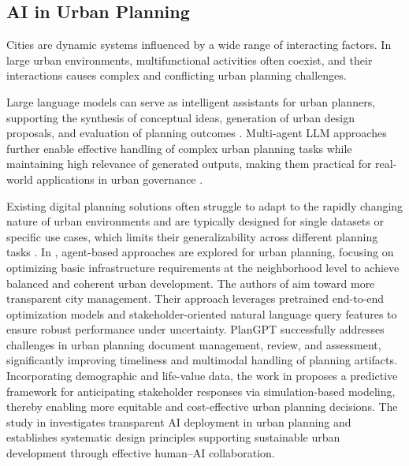 \subsection{AI in Urban Planning}

Cities are dynamic systems influenced by a wide range of interacting factors.
In large urban environments, multifunctional activities often coexist, and their interactions causes complex and conflicting urban planning challenges.

Large language models can serve as intelligent assistants for urban planners, supporting the synthesis of conceptual ideas, generation of urban design proposals, and evaluation of planning outcomes \cite{zheng2025urban}.
Multi-agent LLM approaches further enable effective handling of complex urban planning tasks while maintaining high relevance of generated outputs, making them practical for real-world applications in urban governance \cite{kalyuzhnaya2025llm}.

Existing digital planning solutions often struggle to adapt to the rapidly changing nature of urban environments and are typically designed for single datasets or specific use cases, which limits their generalizability across different planning tasks \cite{XIA2025106142}.
In \cite{singla2024adaptive}, agent-based approaches are explored for urban planning, focusing on optimizing basic infrastructure requirements at the neighborhood level to achieve balanced and coherent urban development.
The authors of \cite{jiao2024city} aim toward more transparent city management.
Their approach leverages pretrained end-to-end optimization models and stakeholder-oriented natural language query features to ensure robust performance under uncertainty. PlanGPT \cite{zhu2024plangpt} successfully addresses challenges in urban planning document management, review, and assessment, significantly improving timeliness and multimodal handling of planning artifacts.
Incorporating demographic and life-value data, the work in \cite{gao2025simulating} proposes a predictive framework for anticipating stakeholder responses via simulation-based modeling, thereby enabling more equitable and cost-effective urban planning decisions.
The study in \cite{LIU2025100666} investigates transparent AI deployment in urban planning and establishes systematic design principles supporting sustainable urban development through effective human–AI collaboration.

